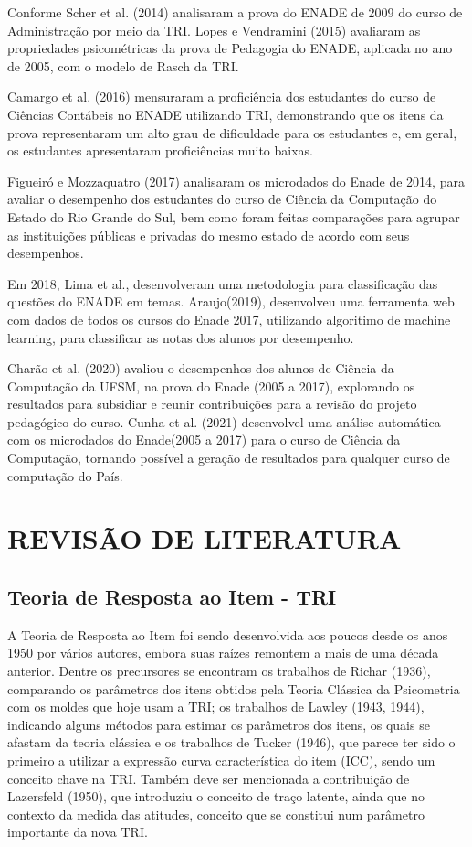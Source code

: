 \documentclass[12pt]{article}
\begin{document}
Conforme Scher et al. (2014) analisaram a prova do ENADE de 2009 do curso de Administração por meio da TRI. Lopes e Vendramini (2015) avaliaram as propriedades psicométricas da prova de Pedagogia do ENADE, aplicada no ano de 2005, com o modelo de Rasch da TRI.

Camargo et al. (2016) mensuraram a proficiência dos estudantes do curso de Ciências Contábeis no ENADE utilizando TRI, demonstrando que os itens da prova representaram um alto grau de dificuldade para os estudantes e, em geral, os estudantes apresentaram proficiências muito baixas.

Figueiró e Mozzaquatro (2017) analisaram os microdados do Enade de 2014, para avaliar o desempenho dos estudantes do curso de Ciência da
Computação do Estado do Rio Grande do Sul, bem como foram feitas comparações para
agrupar as instituições públicas e privadas do mesmo estado de acordo com seus
desempenhos.


Em 2018, Lima et al., desenvolveram uma metodologia para classificação das questões do ENADE em temas. Araujo(2019), desenvolveu uma ferramenta web com dados de todos os cursos do Enade 2017, utilizando algoritimo de machine learning, para classificar as notas dos alunos por desempenho.

Charão et al. (2020) avaliou o desempenhos dos alunos de Ciência da Computação da UFSM, na prova do Enade (2005 a 2017), explorando os resultados para subsidiar e reunir contribuições para a revisão do projeto pedagógico do curso. Cunha et al. (2021) desenvolvel uma análise automática com os microdados do Enade(2005 a 2017) para o curso de Ciência da Computação, tornando possível a geração de resultados para qualquer curso de computação do País.
\vskip0.3cm

\section{REVISÃO DE LITERATURA} \label{sec:firstpage}
\subsection{Teoria de Resposta ao Item - TRI}

A Teoria de Resposta ao Item foi sendo desenvolvida aos poucos desde os anos 1950 por vários autores, embora suas raízes remontem a mais de uma década anterior. Dentre os precursores se encontram os trabalhos de Richar (1936), comparando os parâmetros dos itens obtidos pela Teoria Clássica da Psicometria com os moldes que hoje usam a TRI; os trabalhos de Lawley (1943, 1944), indicando alguns métodos para estimar os parâmetros dos itens, os quais se afastam da teoria clássica e os trabalhos de Tucker (1946), que parece ter sido o primeiro a utilizar a expressão curva característica do item (ICC), sendo um conceito chave na TRI. Também deve ser mencionada a contribuição de Lazersfeld (1950), que introduziu o conceito de traço latente, ainda que no contexto da medida das atitudes, conceito que se constitui num parâmetro importante da nova TRI.
\end{document}
